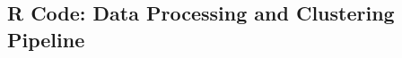 \documentclass{article}
\begin{document}
\clearpage
\begin{appendices}
\section{R Code: Data Processing and Clustering Pipeline}



\end{appendices}

\clearpage



\end{document}
